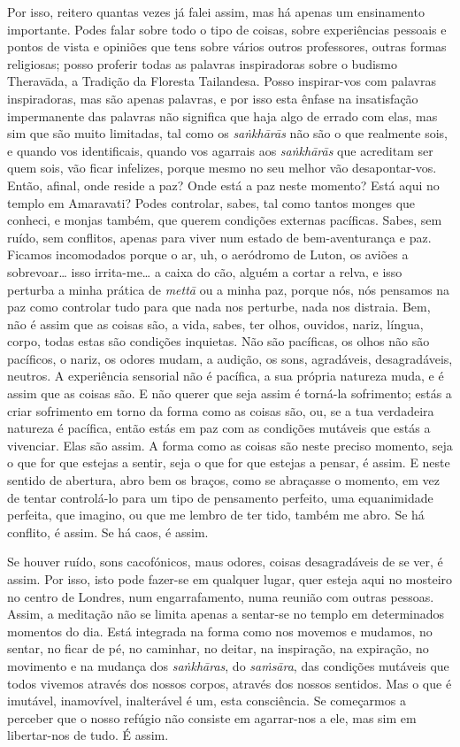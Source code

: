Por isso, reitero quantas vezes já falei assim, mas há apenas um ensinamento
importante. Podes falar sobre todo o tipo de coisas, sobre experiências pessoais
e pontos de vista e opiniões que tens sobre vários outros professores, outras
formas religiosas; posso proferir todas as palavras inspiradoras sobre o budismo
Theravāda, a Tradição da Floresta Tailandesa. Posso inspirar-vos com palavras
inspiradoras, mas são apenas palavras, e por isso esta ênfase na insatisfação
impermanente das palavras não significa que haja algo de errado com elas, mas
sim que são muito limitadas, tal como os \emph{saṅkhārās} não são o que realmente sois,
e quando vos identificais, quando vos agarrais aos \emph{saṅkhārās} que acreditam ser
quem sois, vão ficar infelizes, porque mesmo no seu melhor vão desapontar-vos.
Então, afinal, onde reside a paz? Onde está a paz neste momento? Está aqui no
templo em Amaravati? Podes controlar, sabes, tal como tantos monges que conheci,
e monjas também, que querem condições externas pacíficas. Sabes, sem ruído, sem
conflitos, apenas para viver num estado de bem-aventurança e paz. Ficamos
incomodados porque o ar, uh, o aeródromo de Luton, os aviões a sobrevoar\ldots{}
isso irrita-me\ldots{} a caixa do cão, alguém a cortar a relva, e isso perturba
a minha prática de \emph{mettā} ou a minha paz, porque nós, nós pensamos na paz como
controlar tudo para que nada nos perturbe, nada nos distraia. Bem, não é assim
que as coisas são, a vida, sabes, ter olhos, ouvidos, nariz, língua, corpo,
todas estas são condições inquietas. Não são pacíficas, os olhos não são
pacíficos, o nariz, os odores mudam, a audição, os sons, agradáveis,
desagradáveis, neutros. A experiência sensorial não é pacífica, a sua própria
natureza muda, e é assim que as coisas são. E não querer que seja assim é
torná-la sofrimento; estás a criar sofrimento em torno da forma como as coisas
são, ou, se a tua verdadeira natureza é pacífica, então estás em paz com as
condições mutáveis que estás a vivenciar. Elas são assim. A forma como as coisas
são neste preciso momento, seja o que for que estejas a sentir, seja o que for
que estejas a pensar, é assim. E neste sentido de abertura, abro bem os braços,
como se abraçasse o momento, em vez de tentar controlá-lo para um tipo de
pensamento perfeito, uma equanimidade perfeita, que imagino, ou que me lembro de
ter tido, também me abro. Se há conflito, é assim. Se há caos, é assim.

Se houver ruído, sons cacofónicos, maus odores, coisas desagradáveis de se ver,
é assim. Por isso, isto pode fazer-se em qualquer lugar, quer esteja aqui no
mosteiro no centro de Londres, num engarrafamento, numa reunião com outras
pessoas. Assim, a meditação não se limita apenas a sentar-se no templo em
determinados momentos do dia. Está integrada na forma como nos movemos e
mudamos, no sentar, no ficar de pé, no caminhar, no deitar, na inspiração, na
expiração, no movimento e na mudança dos \emph{saṅkhāras}, do \emph{saṁsāra}, das condições
mutáveis que todos vivemos através dos nossos corpos, através dos nossos
sentidos. Mas o que é imutável, inamovível, inalterável é um, esta consciência.
Se começarmos a perceber que o nosso refúgio não consiste em agarrar-nos a ele,
mas sim em libertar-nos de tudo. É assim.

